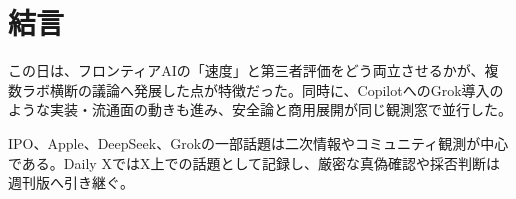 \section{結言}
この日は、フロンティアAIの「速度」と第三者評価をどう両立させるかが、複数ラボ横断の議論へ発展した点が特徴だった。同時に、CopilotへのGrok導入のような実装・流通面の動きも進み、安全論と商用展開が同じ観測窓で並行した。

IPO、Apple、DeepSeek、Grokの一部話題は二次情報やコミュニティ観測が中心である。Daily XではX上での話題として記録し、厳密な真偽確認や採否判断は週刊版へ引き継ぐ。
